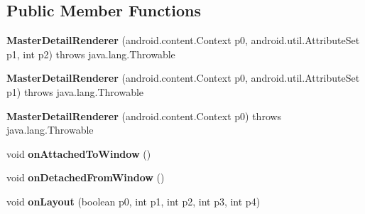 \subsection*{Public Member Functions}
\begin{DoxyCompactItemize}
\item 
\mbox{\label{classmd5b60ffeb829f638581ab2bb9b1a7f4f3f_1_1MasterDetailRenderer_a151e8a0190a84dac40712c929fe981f1}} 
{\bfseries Master\+Detail\+Renderer} (android.\+content.\+Context p0, android.\+util.\+Attribute\+Set p1, int p2)  throws java.\+lang.\+Throwable 	
\item 
\mbox{\label{classmd5b60ffeb829f638581ab2bb9b1a7f4f3f_1_1MasterDetailRenderer_a20b50dd51874695ded02789310f2c483}} 
{\bfseries Master\+Detail\+Renderer} (android.\+content.\+Context p0, android.\+util.\+Attribute\+Set p1)  throws java.\+lang.\+Throwable 	
\item 
\mbox{\label{classmd5b60ffeb829f638581ab2bb9b1a7f4f3f_1_1MasterDetailRenderer_a14ed5c8eab58b78a200c47600daacb7b}} 
{\bfseries Master\+Detail\+Renderer} (android.\+content.\+Context p0)  throws java.\+lang.\+Throwable 	
\item 
\mbox{\label{classmd5b60ffeb829f638581ab2bb9b1a7f4f3f_1_1MasterDetailRenderer_acc8d8c4d884449690cd40a8f06d08aab}} 
void {\bfseries on\+Attached\+To\+Window} ()
\item 
\mbox{\label{classmd5b60ffeb829f638581ab2bb9b1a7f4f3f_1_1MasterDetailRenderer_a01bbe4838a0a0c8ca1752f6a5ecd27b9}} 
void {\bfseries on\+Detached\+From\+Window} ()
\item 
\mbox{\label{classmd5b60ffeb829f638581ab2bb9b1a7f4f3f_1_1MasterDetailRenderer_a2a0acae4af9b3446d79e18c5f8817773}} 
void {\bfseries on\+Layout} (boolean p0, int p1, int p2, int p3, int p4)
\item 
\mbox{\label{classmd5b60ffeb829f638581ab2bb9b1a7f4f3f_1_1MasterDetailRenderer_a7be721926ef6bb33d645447e19697a2a}} 

\end{DoxyCompactItemize}
